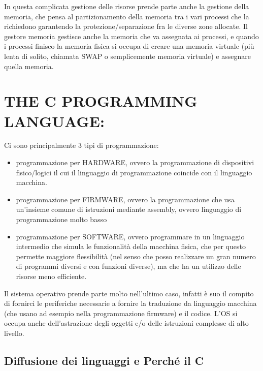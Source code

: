 \documentclass[
  paper=a4,
  oneside  ,captions=tableheading
]{scrbook}
\providecommand{\tightlist}{%
  \setlength{\itemsep}{0pt}\setlength{\parskip}{0pt}}
\begin{document}
In questa complicata gestione delle risorse prende parte anche la
gestione della memoria, che pensa al partizionamento della memoria tra i
vari processi che la richiedono garantendo la protezione/separazione fra
le diverse zone allocate. Il gestore memoria gestisce anche la memoria
che va assegnata ai processi, e quando i processi finisco la memoria
fisica si occupa di creare una memoria virtuale (più lenta di solito,
chiamata SWAP o semplicemente memoria virtuale) e assegnare quella
memoria.

\hypertarget{the-c-programming-language}{%
\section{THE C PROGRAMMING LANGUAGE:}\label{the-c-programming-language}}

Ci sono principalmente 3 tipi di programmazione:

\begin{itemize}
\tightlist
\item
  programmazione per HARDWARE, ovvero la programmazione di dispositivi
  fisico/logici il cui il linguaggio di programmazione coincide con il
  linguaggio macchina.
\item
  programmazione per FIRMWARE, ovvero la programmazione che usa
  un'insieme comune di istruzioni mediante assembly, ovvero linguaggio
  di programmazione molto basso
\item
  programmazione per SOFTWARE, ovvero programmare in un linguaggio
  intermedio che simula le funzionalità della macchina fisica, che per
  questo permette maggiore flessibilità (nel senso che posso realizzare
  un gran numero di programmi diversi e con funzioni diverse), ma che ha
  un utilizzo delle risorse meno efficiente.
\end{itemize}

Il sistema operativo prende parte molto nell'ultimo caso, infatti è suo
il compito di fornirci le periferiche necessarie a fornire la traduzione
da linguaggio macchina (che usano ad esempio nella programmazione
firmware) e il codice. L'OS si occupa anche dell'astrazione degli
oggetti e/o delle istruzioni complesse di alto livello.

\hypertarget{diffusione-dei-linguaggi-e-perchuxe9-il-c}{%
\subsection{Diffusione dei linguaggi e Perché il
C}\label{diffusione-dei-linguaggi-e-perchuxe9-il-c}}
\end{document}
